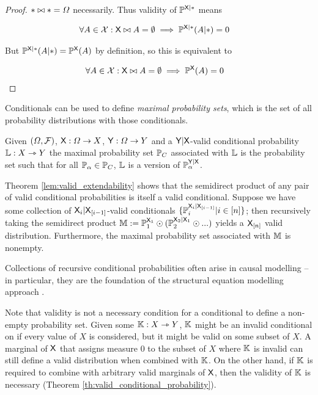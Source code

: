 \begin{proof}
$*\bowtie *=\Omega$ necessarily. Thus validity of $\mathbb{P}^{\mathsf{X}|*}$ means 

\begin{align}
    \forall A\in \mathcal{X}: \mathsf{X}\bowtie A=\emptyset \implies \mathbb{P}^{\mathsf{X}|*}(A|*)&=0
\end{align}

But $\mathbb{P}^{\mathsf{X}|*}(A|*)=\mathbb{P}^{\mathsf{X}}(A)$ by definition, so this is equivalent to

\begin{align}
    \forall A\in \mathcal{X}: \mathsf{X}\bowtie A=\emptyset \implies \mathbb{P}^{\mathsf{X}}(A)&=0
\end{align}
\end{proof}

Conditionals can be used to define \emph{maximal probability sets}, which is the set of all probability distributions with those conditionals.

\begin{definition}
Given $(\Omega,\mathcal{F})$, $\mathsf{X}:\Omega\to X$, $\mathsf{Y}:\Omega\to Y$ and a $\mathsf{Y}|\mathsf{X}$-valid conditional probability $\mathbb{L}:X\rightarrowtriangle Y$ the maximal probability set $\mathbb{P}_C$ associated with $\mathbb{L}$ is the probability set such that for all $\mathbb{P}_\alpha\in \mathbb{P}_C$, $\mathbb{L}$ is a version of $\mathbb{P}_\alpha^{\mathsf{Y}|\mathsf{X}}$.
\end{definition}

Theorem \ref{lem:valid_extendability} shows that the semidirect product of any pair of valid conditional probabilities is itself a valid conditional. Suppose we have some collection of $\mathsf{X}_i|\mathsf{X}_{[i-1]}$-valid conditionals $\{\mathbb{P}_i^{\mathsf{X}_i|\mathsf{X}_{[i-1]}}|i\in [n]\}$; then recursively taking the semidirect product $\mathbb{M}:=\mathbb{P}_1^{\mathsf{X}_1}\odot (\mathbb{P}_2^{\mathsf{X}_2|\mathsf{X}_{1}}\odot ...)$ yields a $\mathsf{X}_{[n]}$ valid distribution. Furthermore, the maximal probability set associated with $\mathbb{M}$ is nonempty.

Collections of recursive conditional probabilities often arise in causal modelling -- in particular, they are the foundation of the structural equation modelling approach \citet{richardson2013single,pearl_causality:_2009}.

Note that validity is not a necessary condition for a conditional to define a non-empty probability set. Given some $\mathbb{K}:X\rightarrowtriangle Y$, $\mathbb{K}$ might be an invalid conditional on if every value of $X$ is considered, but it might be valid on some subset of $X$. A marginal of $\mathsf{X}$ that assigns measure 0 to the subset of $X$ where $\mathbb{K}$ is invalid can still define a valid distribution when combined with $\mathbb{K}$. On the other hand, if $\mathbb{K}$ is required to combine with arbitrary valid marginals of $\mathsf{X}$, then the validity of $\mathbb{K}$ is necessary (Theorem \ref{th:valid_conditional_probability}).

